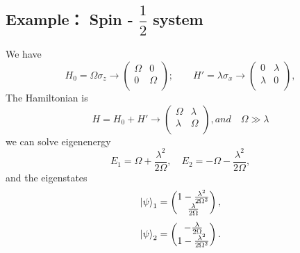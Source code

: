 \documentclass[UTF8,12pt]{article} %
\begin{document}
\subsection*{Example： Spin - $\dfrac{1}{2}$ system}
We have
\begin{equation*}
    H_0=\Omega \sigma_z \to \begin{pmatrix}
     \Omega & 0 \\
     0 & \Omega \\   
    \end{pmatrix} ; \hspace{2em}
    H'=\lambda \sigma_x \to \begin{pmatrix}
        0 & \lambda \\
        \lambda & 0 \\   
       \end{pmatrix} ,
\end{equation*}
The Hamiltonian is
\begin{equation*}
    H=H_0+H' \to \begin{pmatrix}
        \Omega & \lambda \\
        \lambda & \Omega \\
    \end{pmatrix} , and \hspace{1em} \Omega \gg \lambda
\end{equation*}
we can solve eigenenergy 
\begin{equation*}
    E_1=\Omega + \frac{\lambda^2}{2\Omega} , \hspace{1em} E_2=-\Omega - \frac{\lambda^2}{2\Omega} ,
\end{equation*}
and the eigenstates
\begin{equation*}
    \ket{\psi}_1= \begin{pmatrix}
        1-\frac{\lambda^2}{2\Omega^2} \\
        \frac{\lambda}{2\Omega} \\ 
    \end{pmatrix} ,
\end{equation*}
\begin{equation*}
    \ket{\psi}_2= \begin{pmatrix}
        -\frac{\lambda}{2\Omega} \\ 
        1-\frac{\lambda^2}{2\Omega^2} \\
    \end{pmatrix} .
\end{equation*}
\end{document}
